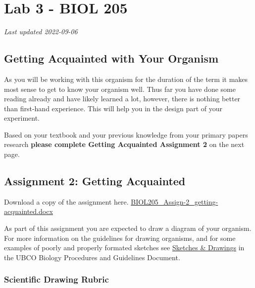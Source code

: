 \documentclass[
]{book}
\begin{document}
\hypertarget{part-lab-3---biol-205}{%
\part*{Lab 3 - BIOL 205}\label{part-lab-3---biol-205}}

\emph{Last updated 2022-09-06}

\hypertarget{getting-acquainted-with-your-organism}{%
\chapter*{Getting Acquainted with Your Organism}\label{getting-acquainted-with-your-organism}}

As you will be working with this organism for the duration of the term it makes most sense to get to know your organism well. Thus far you have done some reading already and have likely learned a lot, however, there is nothing better than first-hand experience. This will help you in the design part of your experiment.

Based on your textbook and your previous knowledge from your primary papers research \textbf{please complete Getting Acquainted Assignment 2} on the next page.

\hypertarget{assignment-2-getting-acquainted}{%
\chapter*{Assignment 2: Getting Acquainted}\label{assignment-2-getting-acquainted}}

Download a copy of the assignment here. \href{https://osf.io/download/xz2rk}{BIOL205\_Assign-2\_getting-acquainted.docx}

As part of this assignment you are expected to draw a diagram of your organism. For more information on the guidelines for drawing organisms, and for some examples of poorly and properly formated sketches see \href{https://ubco-biology.github.io/Procedures-and-Guidelines/sketches-drawings.html}{Sketches \& Drawings} in the UBCO Biology Procedures and Guidelines Document.

\hypertarget{scientific-drawing-rubric}{%
\section*{Scientific Drawing Rubric}\label{scientific-drawing-rubric}}
\end{document}
